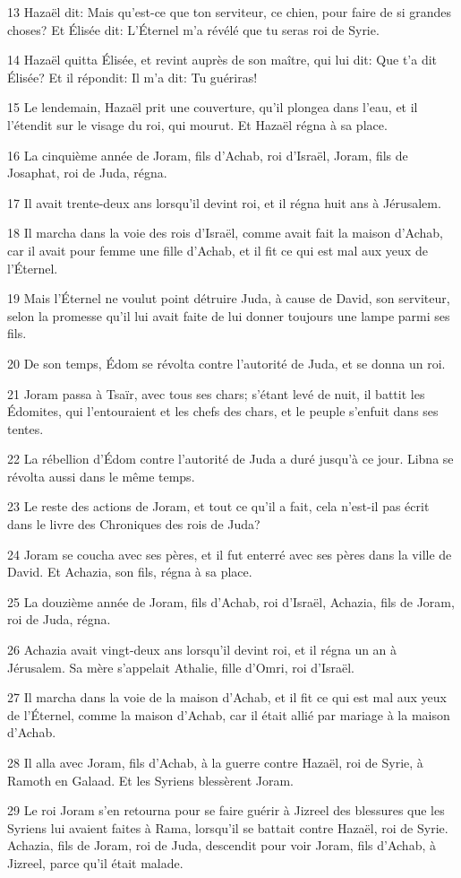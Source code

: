 \par 13 Hazaël dit: Mais qu'est-ce que ton serviteur, ce chien, pour faire de si grandes choses? Et Élisée dit: L'Éternel m'a révélé que tu seras roi de Syrie.
\par 14 Hazaël quitta Élisée, et revint auprès de son maître, qui lui dit: Que t'a dit Élisée? Et il répondit: Il m'a dit: Tu guériras!
\par 15 Le lendemain, Hazaël prit une couverture, qu'il plongea dans l'eau, et il l'étendit sur le visage du roi, qui mourut. Et Hazaël régna à sa place.
\par 16 La cinquième année de Joram, fils d'Achab, roi d'Israël, Joram, fils de Josaphat, roi de Juda, régna.
\par 17 Il avait trente-deux ans lorsqu'il devint roi, et il régna huit ans à Jérusalem.
\par 18 Il marcha dans la voie des rois d'Israël, comme avait fait la maison d'Achab, car il avait pour femme une fille d'Achab, et il fit ce qui est mal aux yeux de l'Éternel.
\par 19 Mais l'Éternel ne voulut point détruire Juda, à cause de David, son serviteur, selon la promesse qu'il lui avait faite de lui donner toujours une lampe parmi ses fils.
\par 20 De son temps, Édom se révolta contre l'autorité de Juda, et se donna un roi.
\par 21 Joram passa à Tsaïr, avec tous ses chars; s'étant levé de nuit, il battit les Édomites, qui l'entouraient et les chefs des chars, et le peuple s'enfuit dans ses tentes.
\par 22 La rébellion d'Édom contre l'autorité de Juda a duré jusqu'à ce jour. Libna se révolta aussi dans le même temps.
\par 23 Le reste des actions de Joram, et tout ce qu'il a fait, cela n'est-il pas écrit dans le livre des Chroniques des rois de Juda?
\par 24 Joram se coucha avec ses pères, et il fut enterré avec ses pères dans la ville de David. Et Achazia, son fils, régna à sa place.
\par 25 La douzième année de Joram, fils d'Achab, roi d'Israël, Achazia, fils de Joram, roi de Juda, régna.
\par 26 Achazia avait vingt-deux ans lorsqu'il devint roi, et il régna un an à Jérusalem. Sa mère s'appelait Athalie, fille d'Omri, roi d'Israël.
\par 27 Il marcha dans la voie de la maison d'Achab, et il fit ce qui est mal aux yeux de l'Éternel, comme la maison d'Achab, car il était allié par mariage à la maison d'Achab.
\par 28 Il alla avec Joram, fils d'Achab, à la guerre contre Hazaël, roi de Syrie, à Ramoth en Galaad. Et les Syriens blessèrent Joram.
\par 29 Le roi Joram s'en retourna pour se faire guérir à Jizreel des blessures que les Syriens lui avaient faites à Rama, lorsqu'il se battait contre Hazaël, roi de Syrie. Achazia, fils de Joram, roi de Juda, descendit pour voir Joram, fils d'Achab, à Jizreel, parce qu'il était malade.

